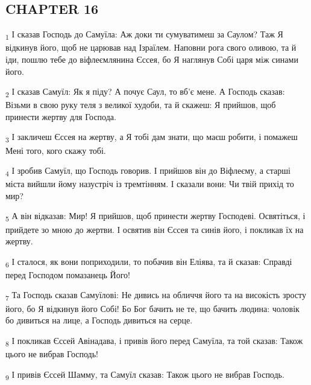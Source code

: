 \subsection{CHAPTER 16}
\begin{tcolorbox}
\textsubscript{1} І сказав Господь до Самуїла: Аж доки ти сумуватимеш за Саулом? Таж Я відкинув його, щоб не царював над Ізраїлем. Наповни рога свого оливою, та й іди, пошлю тебе до віфлеємлянина Єссея, бо Я наглянув Собі царя між синами його.
\end{tcolorbox}
\begin{tcolorbox}
\textsubscript{2} І сказав Самуїл: Як я піду? А почує Саул, то вб'є мене. А Господь сказав: Візьми в свою руку теля з великої худоби, та й скажеш: Я прийшов, щоб принести жертву для Господа.
\end{tcolorbox}
\begin{tcolorbox}
\textsubscript{3} І закличеш Єссея на жертву, а Я тобі дам знати, що маєш робити, і помажеш Мені того, кого скажу тобі.
\end{tcolorbox}
\begin{tcolorbox}
\textsubscript{4} І зробив Самуїл, що Господь говорив. І прийшов він до Віфлеєму, а старші міста вийшли йому назустріч із тремтінням. І сказали вони: Чи твій прихід то мир?
\end{tcolorbox}
\begin{tcolorbox}
\textsubscript{5} А він відказав: Мир! Я прийшов, щоб принести жертву Господеві. Освятіться, і прийдете зо мною до жертви. І освятив він Єссея та синів його, і покликав їх на жертву.
\end{tcolorbox}
\begin{tcolorbox}
\textsubscript{6} І сталося, як вони поприходили, то побачив він Еліява, та й сказав: Справді перед Господом помазанець Його!
\end{tcolorbox}
\begin{tcolorbox}
\textsubscript{7} Та Господь сказав Самуїлові: Не дивись на обличчя його та на високість зросту його, бо Я відкинув його Собі! Бо Бог бачить не те, що бачить людина: чоловік бо дивиться на лице, а Господь дивиться на серце.
\end{tcolorbox}
\begin{tcolorbox}
\textsubscript{8} І покликав Єссей Авінадава, і привів його перед Самуїла, та той сказав: Також цього не вибрав Господь!
\end{tcolorbox}
\begin{tcolorbox}
\textsubscript{9} І привів Єссей Шамму, та Самуїл сказав: Також цього не вибрав Господь.
\end{tcolorbox}
